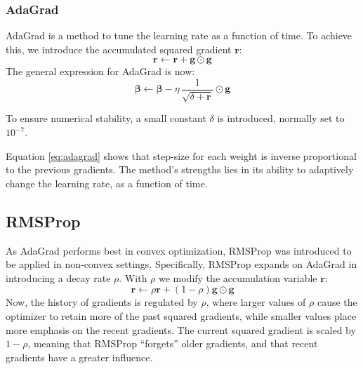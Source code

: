 \documentclass{article}
\begin{document}
\begin{multicols}{2}
\subsubsection*{AdaGrad}
AdaGrad is a method to tune the learning rate as a function of time. To achieve this, we introduce the accumulated squared gradient $\bm{r}$:
$$\bm{r} \leftarrow \bm{r} + \bm{g} \odot \bm{g}$$
The general expression for AdaGrad is now:
\begin{equation} \label{eq:adagrad}
\bm{\beta} \leftarrow \bm{\beta} - \eta \, \frac{1}{\sqrt{\delta +\bm{r}}} \odot \bm{g}
\end{equation}

To ensure numerical stability, a small constant $\delta$ is introduced, normally set to $10^{-7}$. \cite{goodfellow_deep_2016}

Equation \ref{eq:adagrad} shows that step-size for each weight is inverse proportional to the previous gradients. The method's strengths lies in its ability to adaptively change the learning rate, as a function of time.

\subsection*{RMSProp}
As AdaGrad performs best in %
convex optimization, RMSProp was introduced to be applied in non-convex settings. Specifically, RMSProp expands on AdaGrad in introducing a decay rate $\rho$. With $\rho$ we modify the accumulation variable $\bm{r}$:
\begin{equation} \label{eq:RMSProp}
\bm{r} \leftarrow \rho \bm{r} + (1 - \rho) \bm{g} \odot \bm{g}
\end{equation}
Now, the history of gradients is regulated by $\rho$, where larger values of $\rho$ cause the optimizer to retain more of the past squared gradients, while smaller values place more emphasis on the recent gradients. The current squared gradient is scaled by $1 - \rho$, meaning that RMSProp ``forgets'' older gradients, and that recent gradients have a greater influence. \cite{hinton_lecture_nodate}


\end{multicols}
\end{document}
